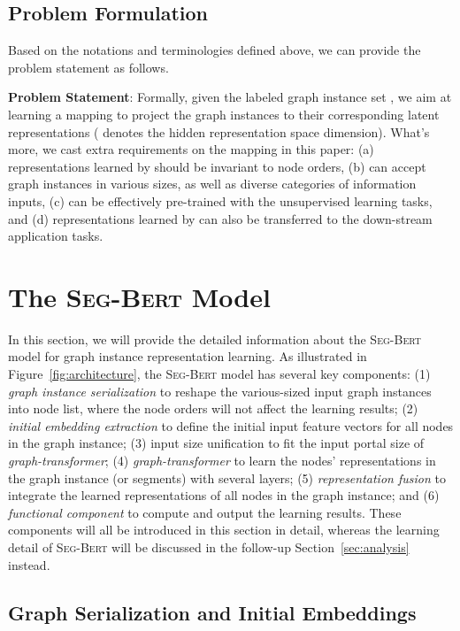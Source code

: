 \documentclass{article}
\newcommand{\our}{\textsc{Seg-Bert}}
\begin{document}
\subsection{Problem Formulation}

Based on the notations and terminologies defined above, we can provide the problem statement as follows.

\noindent \textbf{Problem Statement}: Formally, given the labeled graph instance set , we aim at learning a mapping  to project the graph instances to their corresponding latent representations ( denotes the hidden representation space dimension). What's more, we cast extra requirements on the mapping  in this paper: (a) representations learned by  should be invariant to node orders, (b)  can accept graph instances in various sizes, as well as diverse categories of information inputs, (c)  can be effectively pre-trained with the unsupervised learning tasks, and (d) representations learned by  can also be transferred to the down-stream application tasks.


\section{The {\our} Model}\label{sec:method}


In this section, we will provide the detailed information about the {\our} model for graph instance representation learning. As illustrated in Figure~\ref{fig:architecture}, the {\our} model has several key components: (1) \textit{graph instance serialization} to reshape the various-sized input graph instances into node list, where the node orders will not affect the learning results; (2) \textit{initial embedding extraction} to define the initial input feature vectors for all nodes in the graph instance; (3) input size unification to fit the input portal size of \textit{graph-transformer}; (4) \textit{graph-transformer} to learn the nodes' representations in the graph instance (or segments) with several layers; (5) \textit{representation fusion} to integrate the learned representations of all nodes in the graph instance; and (6) \textit{functional component} to compute and output the learning results. These components will all be introduced in this section in detail, whereas the learning detail of {\our} will be discussed in the follow-up Section~\ref{sec:analysis} instead.




\subsection{Graph Serialization and Initial Embeddings}
\end{document}
